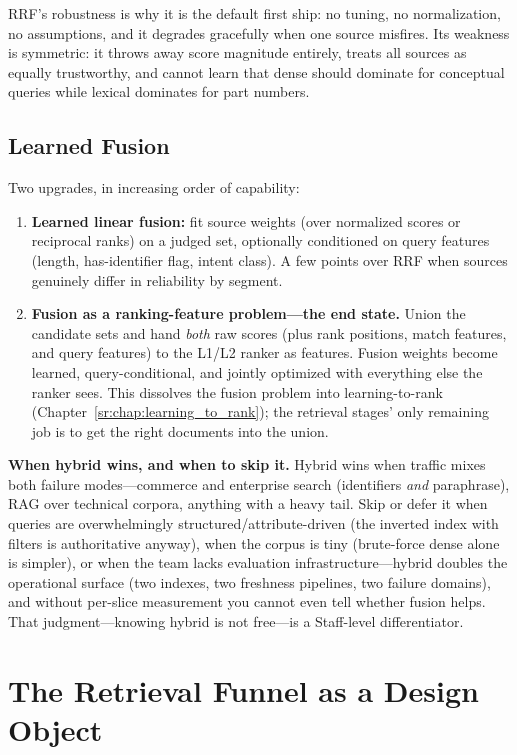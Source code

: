 RRF's robustness is why it is the default first ship: no tuning, no normalization, no assumptions, and it degrades gracefully when one source misfires. Its weakness is symmetric: it throws away score magnitude entirely, treats all sources as equally trustworthy, and cannot learn that dense should dominate for conceptual queries while lexical dominates for part numbers.

\subsection{Learned Fusion}

Two upgrades, in increasing order of capability:
\begin{enumerate}
    \item \textbf{Learned linear fusion:} fit source weights (over normalized scores or reciprocal ranks) on a judged set, optionally conditioned on query features (length, has-identifier flag, intent class). A few points over RRF when sources genuinely differ in reliability by segment.
    \item \textbf{Fusion as a ranking-feature problem---the end state.} Union the candidate sets and hand \textit{both} raw scores (plus rank positions, match features, and query features) to the L1/L2 ranker as features. Fusion weights become learned, query-conditional, and jointly optimized with everything else the ranker sees. This dissolves the fusion problem into learning-to-rank (Chapter~\ref{sr:chap:learning_to_rank}); the retrieval stages' only remaining job is to get the right documents into the union.
\end{enumerate}

\textbf{When hybrid wins, and when to skip it.} Hybrid wins when traffic mixes both failure modes---commerce and enterprise search (identifiers \textit{and} paraphrase), RAG over technical corpora, anything with a heavy tail. Skip or defer it when queries are overwhelmingly structured/attribute-driven (the inverted index with filters is authoritative anyway), when the corpus is tiny (brute-force dense alone is simpler), or when the team lacks evaluation infrastructure---hybrid doubles the operational surface (two indexes, two freshness pipelines, two failure domains), and without per-slice measurement you cannot even tell whether fusion helps. That judgment---knowing hybrid is not free---is a Staff-level differentiator.

\section{The Retrieval Funnel as a Design Object}
\label{sr:sec:retrieval_funnel}

